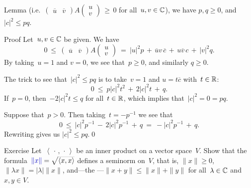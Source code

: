 \documentclass[a]{subfiles}
\begin{document}
\begin{parsec}[hilb]
\begin{point}{Lemma}
(i.e.~$\left(
\begin{smallmatrix}\overline{u}&\overline{v}\end{smallmatrix}\right)
A
\left(\begin{smallmatrix}u \\ v \end{smallmatrix}\right) \,\geq \, 0$
for all~$u,v\in \mathbb{C}$),
we have
$p,q\geq 0$, and $\left|c\right|^2 \leq pq$.
\begin{point}{Proof}%
Let~$u,v\in\mathbb{C}$ be given.
We have
\begin{equation*}
0\ \leq\ 
\left(\begin{smallmatrix}\overline{u}&\overline{v}\end{smallmatrix}\right)
A
\left(\begin{smallmatrix}u \\ v \end{smallmatrix}\right)
\ = \ 
\left|u\right|^2 p\,+\, 
\overline{u}v\,\overline{c} \,+\,
u\overline{v}\,c \,+\,
\left|v\right|^2 q.
\end{equation*}
By taking~$u=1$ and $v=0$, we see that~$p\geq 0$,
and similarly $q\geq 0$.

The trick to see that~$\left|c\right|^2\leq pq$
is to
take~$v=1$ and $u=t\overline{c}$ with~$t\in \mathbb{R}$:
\begin{equation*}
0 \ \leq\ p\left|c\right|^2t^2
\,+\,2\left|c\right|^2t 
\,+\, q.
\end{equation*}
If~$p=0$, then~$-2\left|c\right|^2t \leq q $
for all~$t\in \mathbb{R}$,
which implies that~$\left|c\right|^2=0=pq$.

Suppose that~$p>0$.
Then taking~$t=-p^{-1}$ we see that
\begin{equation*}
0 \ \leq\ \left|c\right|^2p^{-1}
\,-\,2\left|c\right|^2p^{-1} 
\,+\, q \ = \ -\left|c\right|^2p^{-1}\,+\,q.
\end{equation*}
Rewriting gives us
 $\left|c\right|^2\leq pq$.\qed
\end{point}
\end{point}
\begin{point}[inner-product-basic]{Exercise}%
Let~$\left<\,\cdot\,,\,\cdot\,\right>$
be an inner product on a vector space~$V$.
Show that
the formula~$\Define{\|x\|}=\smash{\sqrt{\left<x,x\right>}}$%
defines a seminorm on~$V$,
that is,
$\|x\|\geq 0$,
$\|\lambda x\|=\left|\lambda\right|\|x\|$,
and---the ---$\|x+y\|\leq \|x\|+\|y\|$
for all~$\lambda\in \mathbb{C}$ and~$x,y\in V$.


\end{point}
\end{parsec}
\end{document}
